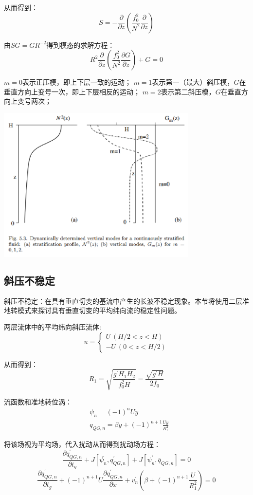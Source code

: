 \documentclass{article}
\begin{document}
从而得到：
$$S = -\frac{\partial}{\partial z}\left(\frac{f_0^2}{N^2}\frac{\partial}{\partial z}\right)$$

由$SG=GR^{-2}$得到模态的求解方程：
$$  R^2\frac{\partial}{\partial z}\left(\frac{f_0^2}{N^2}\frac{\partial G}{\partial z}\right) + G=0$$

$m=0$表示正压模，即上下层一致的运动；
$m=1$表示第一（最大）斜压模，$G$在垂直方向上变号一次，即上下层相反的运动；
$m=2$表示第二斜压模，$G$在垂直方向上变号两次；
\begin{center}
    \includegraphics[width=10cm]{Fig4_2.png}
\end{center}

\subsection{斜压不稳定}
斜压不稳定：在具有垂直切变的基流中产生的长波不稳定现象。本节将使用二层准地转模式来探讨具有垂直切变的平均纬向流的稳定性问题。

两层流体中的平均纬向斜压流体:
$$u=\begin{cases}
    U \ (H/2<z<H) \\
    -U \ (0 < z < H/2)
\end{cases}$$

从而得到：
$$R_1 = \sqrt{\frac{g^{\prime}H_1H_2}{f_0^2H}} = \frac{\sqrt{g^{\prime}H}}{2f_0}$$

流函数和准地转位涡：
\begin{align}
&\psi_n = (-1)^nUy\\
&q_{QG,n} = \beta y + (-1)^{n+1}\frac{Uy}{R_1^2}   
\end{align}

将该场视为平均场，代入扰动从而得到扰动场方程：
$$\frac{\partial q^{\prime}_{QG,n}}{\partial t_g} + J[\bar{\psi_n}, q^{\prime}_{QG,n}] + J[\psi^{\prime}_n, \bar{q}_{QG,n}]= 0$$
$$\frac{\partial q^{\prime}_{QG,n}}{\partial t_g} + (-1)^{n+1}U\frac{\partial q^{\prime}_{QG,n}}{\partial x} + v^{\prime}_n\left(\beta + (-1)^{n+1}\frac{U}{R_1^2}\right)= 0$$
\end{document}
